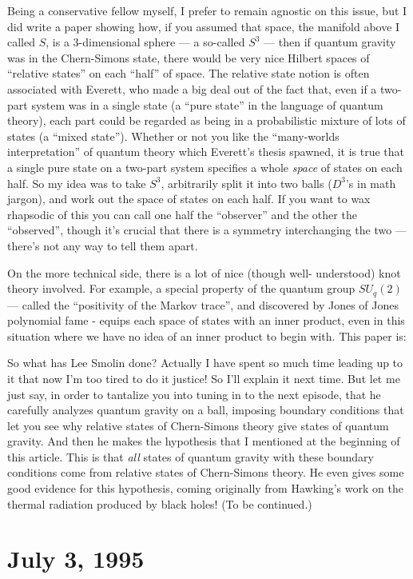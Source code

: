 \documentclass{article}
\def\tightlist{}
\renewcommand{\texttt}[1]{%
  \begingroup
  \ttfamily
  \begingroup\lccode`~=`/\lowercase{\endgroup\def~}{/\discretionary{}{}{}}%
  \begingroup\lccode`~=`[\lowercase{\endgroup\def~}{[\discretionary{}{}{}}%
  \begingroup\lccode`~=`.\lowercase{\endgroup\def~}{.\discretionary{}{}{}}%
  \catcode`/=\active\catcode`[=\active\catcode`.=\active
  \scantokens{#1\noexpand}%
  \endgroup
}
\begin{document}
Being a conservative fellow myself, I prefer to remain agnostic on this
issue, but I did write a paper showing how, if you assumed that space,
the manifold above I called \(S\), is a 3-dimensional sphere --- a
so-called \(S^3\) --- then if quantum gravity was in the Chern-Simons
state, there would be very nice Hilbert spaces of ``relative states'' on
each ``half'' of space. The relative state notion is often associated
with Everett, who made a big deal out of the fact that, even if a
two-part system was in a single state (a ``pure state'' in the language
of quantum theory), each part could be regarded as being in a
probabilistic mixture of lots of states (a ``mixed state''). Whether or
not you like the ``many-worlds interpretation'' of quantum theory which
Everett's thesis spawned, it is true that a single pure state on a
two-part system specifies a whole \emph{space} of states on each half.
So my idea was to take \(S^3\), arbitrarily split it into two balls
(\(D^3\)'s in math jargon), and work out the space of states on each
half. If you want to wax rhapsodic of this you can call one half the
``observer'' and the other the ``observed'', though it's crucial that
there is a symmetry interchanging the two --- there's not any way to
tell them apart.

On the more technical side, there is a lot of nice (though well-
understood) knot theory involved. For example, a special property of the
quantum group \(SU_q(2)\) --- called the ``positivity of the Markov
trace'', and discovered by Jones of Jones polynomial fame - equips each
space of states with an inner product, even in this situation where we
have no idea of an inner product to begin with. This paper is:


So what has Lee Smolin done? Actually I have spent so much time leading
up to it that now I'm too tired to do it justice! So I'll explain it
next time. But let me just say, in order to tantalize you into tuning in
to the next episode, that he carefully analyzes quantum gravity on a
ball, imposing boundary conditions that let you see why relative states
of Chern-Simons theory give states of quantum gravity. And then he makes
the hypothesis that I mentioned at the beginning of this article. This
is that \emph{all} states of quantum gravity with these boundary
conditions come from relative states of Chern-Simons theory. He even
gives some good evidence for this hypothesis, coming originally from
Hawking's work on the thermal radiation produced by black holes! (To be
continued.)
\hypertarget{week57}{%
\section{July 3, 1995}\label{week57}}
\end{document}
